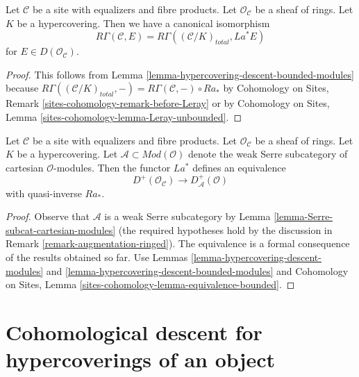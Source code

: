 \begin{lemma}
\label{lemma-compare-cohomology-hypercovering-modules}
Let $\mathcal{C}$ be a site with equalizers and fibre products.
Let $\mathcal{O}_\mathcal{C}$ be a sheaf of rings.
Let $K$ be a hypercovering.
Then we have a canonical isomorphism
$$
R\Gamma(\mathcal{C}, E) =
R\Gamma((\mathcal{C}/K)_{total}, La^*E)
$$
for $E \in D(\mathcal{O}_\mathcal{C})$.
\end{lemma}

\begin{proof}
This follows from Lemma \ref{lemma-hypercovering-descent-bounded-modules}
because $R\Gamma((\mathcal{C}/K)_{total}, -) =
R\Gamma(\mathcal{C}, -) \circ Ra_*$ by
Cohomology on Sites, Remark \ref{sites-cohomology-remark-before-Leray}
or by
Cohomology on Sites, Lemma \ref{sites-cohomology-lemma-Leray-unbounded}.
\end{proof}

\begin{lemma}
\label{lemma-hypercovering-equivalence-bounded-modules}
Let $\mathcal{C}$ be a site with equalizers and fibre products.
Let $\mathcal{O}_\mathcal{C}$ be a sheaf of rings.
Let $K$ be a hypercovering.
Let $\mathcal{A} \subset \textit{Mod}(\mathcal{O})$
denote the weak Serre subcategory of cartesian $\mathcal{O}$-modules.
Then the functor $La^*$ defines an equivalence
$$
D^+(\mathcal{O}_\mathcal{C}) \longrightarrow D_\mathcal{A}^+(\mathcal{O})
$$
with quasi-inverse $Ra_*$.
\end{lemma}

\begin{proof}
Observe that $\mathcal{A}$ is a weak Serre subcategory by
Lemma \ref{lemma-Serre-subcat-cartesian-modules}
(the required hypotheses hold by the discussion in
Remark \ref{remark-augmentation-ringed}).
The equivalence is a
formal consequence of the results obtained so far. Use
Lemmas \ref{lemma-hypercovering-descent-modules} and
\ref{lemma-hypercovering-descent-bounded-modules} and
Cohomology on Sites, Lemma \ref{sites-cohomology-lemma-equivalence-bounded}.
\end{proof}






\section{Cohomological descent for hypercoverings of an object}
\label{section-cohomological-descent-hypercoverings-X}

